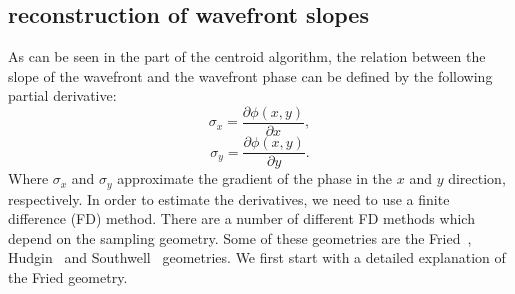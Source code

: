 \documentclass{article}
\begin{document}
\subsection{reconstruction of wavefront slopes}
As can be seen in the part of the centroid algorithm, the relation between the slope of the wavefront and the wavefront phase can be defined by the following partial derivative:
$$ \sigma_x = \frac{\partial\phi(x,y)}{\partial x},$$ 
$$ \sigma_y = \frac{\partial\phi(x,y)}{\partial y}.$$ 
Where $\sigma_x$ and $\sigma_y$ approximate the gradient of the phase in the $x$ and $y$ direction, respectively.
In order to estimate the derivatives, we need to use a finite difference (FD) method. There are a number of different FD methods which depend on the sampling geometry. Some of these geometries are the Fried~\cite{fried1977least}, Hudgin~\cite{hudgin1977wave} and Southwell~\cite{southwell1980wave} geometries. We first start with a detailed explanation of the Fried geometry.
\end{document}
